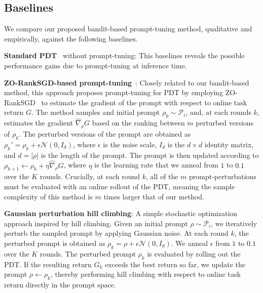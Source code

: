 \documentclass{article}
\begin{document}
\subsection{Baselines}\label{sec:baselines}
We compare our proposed bandit-based prompt-tuning method, qualitative and empirically, against the following baselines.

\textbf{Standard PDT}~\citep{xu2022prompting} without prompt-tuning: This baselines reveals the possible performance gains due to prompt-tuning at inference time.

\textbf{ZO-RankSGD-based prompt-tuning}~\citep{hu2023prompt}: Closely related to our bandit-based method, this approach proposes prompt-tuning for PDT by employing ZO-RankSGD~\citep{tang2023zeroth} to estimate the gradient of the prompt with respect to online task return $G$. The method samples and initial prompt $\rho_0 \sim \mathcal{P}_i$, and, at each rounds $k$, estimates the gradient 
$\hat{\nabla}_{\rho} G$ 
based on the ranking between $m$ perturbed versions of $\rho_k$.  The perturbed versions of the prompt are obtained as $\rho_k' = \rho_k + \epsilon \mathcal{N}(0, I_d)$, where $\epsilon$ is the noise scale, $I_d$ is the $d \times d$ identity matrix, and $d = |\rho|$ is the length of the prompt.
The prompt is then updated according to $\rho_{k+1} \leftarrow \rho_k + \eta\hat{\nabla}_{\rho} G$, where $\eta$ is the learning rate that we anneal from $1$ to $0.1$ over the $K$ rounds. 
Crucially, at each round $k$, all of the $m$ prompt-perturbations must be evaluated with an online rollout of the PDT, meaning the sample complexity of this method is $m$ times larger that of our method.

\textbf{Gaussian perturbation hill climbing}: A simple stochastic optimization approach inspired by hill climbing. Given an initial prompt $\rho \sim \mathcal{P}_i$, we iteratively perturb the sampled prompt by applying Gaussian noise. 
At each round $k$, the perturbed prompt is obtained as $\rho_k = \rho + \epsilon \mathcal{N}(0, I_d)$.
We anneal $\epsilon$ from $1$ to $0.1$ over the $K$ rounds. The perturbed prompt $\rho_k$ is evaluated by rolling out the PDT. If the resulting return $G_k$ exceeds the best return so far, we update the prompt $\rho \leftarrow \rho_k$, thereby performing hill climbing with respect to online task return directly in the prompt space.
    
\end{document}
